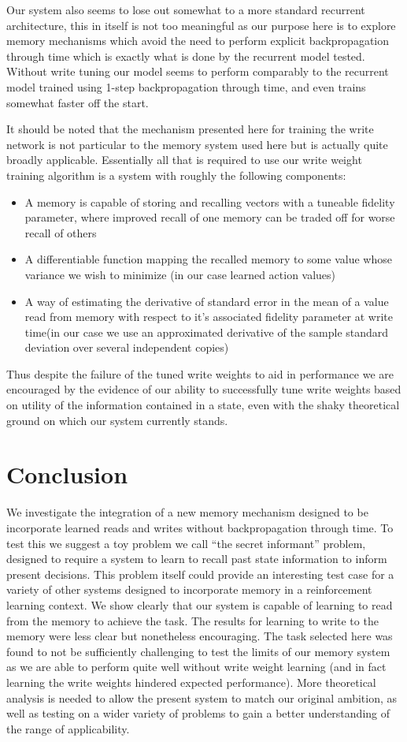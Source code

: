 \documentclass{article}
\begin{document}
Our system also seems to lose out somewhat to a more standard recurrent architecture, this in itself is not too meaningful as our purpose here is to explore memory mechanisms which avoid the need to perform explicit backpropagation through time which is exactly what is done by the recurrent model tested. Without write tuning our model seems to perform comparably to the recurrent model trained using 1-step backpropagation through time, and even trains somewhat faster off the start.

It should be noted that the mechanism presented here for training the write network is not particular to the memory system used here but is actually quite broadly applicable. Essentially all that is required to use our write weight training algorithm is a system with roughly the following components:
\begin{itemize}
\item A memory is capable of storing and recalling vectors with a tuneable fidelity parameter, where improved recall of one memory can be traded off for worse recall of others
\item A differentiable function mapping the recalled memory to some value whose variance we wish to minimize (in our case learned action values)
\item A way of estimating the derivative of standard error in the mean of a value read from memory with respect to it's associated fidelity parameter at write time(in our case we use an approximated derivative of the sample standard deviation over several independent copies)
\end{itemize}
Thus despite the failure of the tuned write weights to aid in performance we are encouraged by the evidence of our ability to successfully tune write weights based on utility of the information contained in a state, even with the shaky theoretical ground on which our system currently stands.

\section*{Conclusion}
We investigate the integration of a new memory mechanism designed to be incorporate learned reads and writes without backpropagation through time. To test this we suggest a toy problem we call ``the secret informant'' problem, designed to require a system to learn to recall past state information to inform present decisions. This problem itself could provide an interesting test case for a variety of other systems designed to incorporate memory in a reinforcement learning context. We show clearly that our system is capable of learning to read from the memory to achieve the task. The results for learning to write to the memory were less clear but nonetheless encouraging. The task selected here was found to not be sufficiently challenging to test the limits of our memory system as we are able to perform quite well without write weight learning (and in fact learning the write weights hindered expected performance). More theoretical analysis is needed to allow the present system to match our original ambition, as well as testing on a wider variety of problems to gain a better understanding of the range of applicability.
\end{document}
